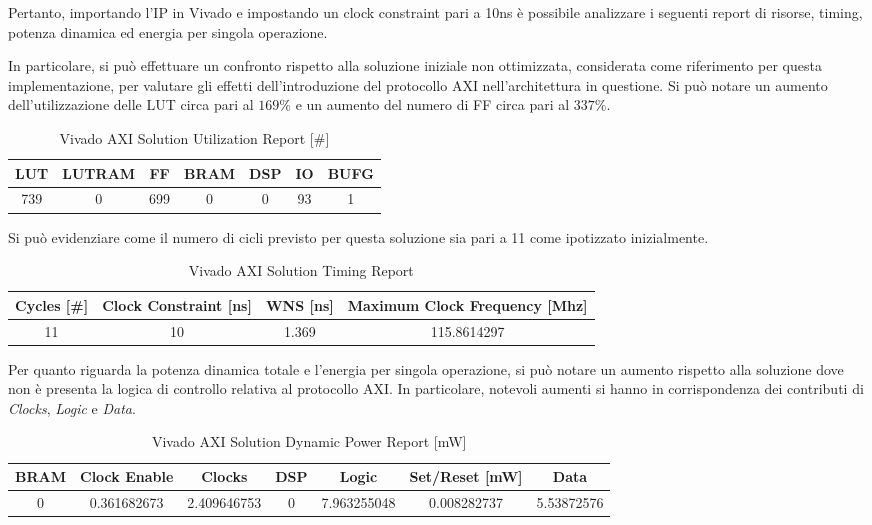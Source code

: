 Pertanto, importando l'IP in Vivado e impostando un clock constraint pari a 10ns è possibile analizzare i seguenti report di risorse, timing, potenza dinamica ed energia per singola operazione.

In particolare, si può effettuare un confronto rispetto alla soluzione iniziale non ottimizzata, considerata come riferimento per questa implementazione, per valutare gli effetti dell'introduzione del protocollo AXI nell'architettura in questione. Si può notare un aumento dell'utilizzazione delle LUT circa pari al $169\%$ e un aumento del numero di FF circa pari al $337\%$. 
\begin{table}[H]
	\centering
	\begin{tabular}{|c|c|c|c|c|c|c|}
		\hline
		\textbf{LUT} & \textbf{LUTRAM} & \textbf{FF} & \textbf{BRAM} & \textbf{DSP} & \textbf{IO} & \textbf{BUFG} \\
		\hline
		739 & 0 & 699 & 0 & 0 & 93 & 1 \\
		\hline
	\end{tabular}
	\caption{Vivado AXI Solution Utilization Report [\#]}
	\label{tab:vivado-axi-solution-utilization-report}
\end{table}

Si può evidenziare come il numero di cicli previsto per questa soluzione sia pari a 11 come ipotizzato inizialmente.

\begin{table}[H]
	\centering
	\begin{tabular}{|c|c|c|c|}
		\hline
		\textbf{Cycles} [\#] & \textbf{Clock Constraint} [ns] & \textbf{WNS} [ns] & \textbf{Maximum Clock Frequency} [Mhz] \\
		\hline
		11 & 10 & 1.369 & 115.8614297 \\
		\hline
	\end{tabular}
	\caption{Vivado AXI Solution Timing Report}
	\label{tab:vivado-axi-solution-timing-report}
\end{table}

Per quanto riguarda la potenza dinamica totale e l'energia per singola operazione, si può notare un aumento rispetto alla soluzione dove non è presenta la logica di controllo relativa al protocollo AXI. In particolare, notevoli aumenti si hanno in corrispondenza dei contributi di \textit{Clocks}, \textit{Logic} e \textit{Data}.

\begin{table}[H]
	\centering
	\begin{tabular}{|c|c|c|c|c|c|c|}
		\hline
		\textbf{BRAM} & \textbf{Clock Enable} & \textbf{Clocks} & \textbf{DSP} & \textbf{Logic} & \textbf{Set/Reset} [mW] & \textbf{Data} \\
		\hline
		0 & 0.361682673 & 2.409646753 & 0 & 7.963255048 & 0.008282737 & 5.53872576 \\
		\hline
	\end{tabular}
	\caption{Vivado AXI Solution Dynamic Power Report [mW]}
	\label{tab:vivado-axi-solution-dynamic-power-report}
\end{table}

